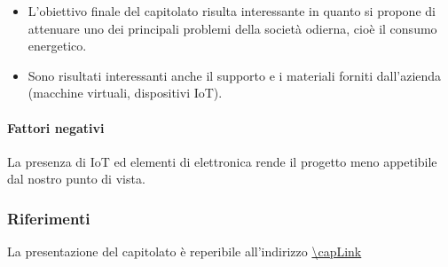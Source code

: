 \begin{itemize}
    \item L'obiettivo finale del capitolato risulta interessante in quanto si propone di attenuare uno dei principali problemi della società odierna, cioè il consumo energetico.
    \item Sono risultati interessanti anche il supporto e i materiali forniti dall'azienda (macchine virtuali, dispositivi IoT).
\end{itemize}

\paragraph{Fattori negativi}
La presenza di IoT ed elementi di elettronica rende il progetto meno appetibile dal nostro punto di vista.

\subsubsection{Riferimenti}
La presentazione del capitolato è reperibile all'indirizzo \url{\capLink} \hfill{}